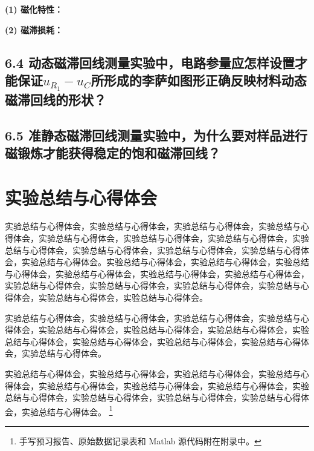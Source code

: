 \documentclass[UTF8]{article}
\theoremstyle{MyLineTheoremStyle} %
\theoremstyle{MyBlockTheoremStyle} %
\theoremstyle{MySubsubsectionStyle} %
\begin{document}
\noindent\textbf{(1) 磁化特性：}



\noindent\textbf{(2) 磁滞损耗：}



\subsection*{6.4 动态磁滞回线测量实验中，电路参量应怎样设置才能保证$u_{R_1}-u_C$所形成的李萨如图形正确反映材料动态磁滞回线的形状？}



\subsection*{6.5 准静态磁滞回线测量实验中，为什么要对样品进行磁锻炼才能获得稳定的饱和磁滞回线？}



\section{实验总结与心得体会}

实验总结与心得体会，实验总结与心得体会，实验总结与心得体会，实验总结与心得体会，实验总结与心得体会，实验总结与心得体会，实验总结与心得体会，实验总结与心得体会，实验总结与心得体会，实验总结与心得体会，实验总结与心得体会，实验总结与心得体会。实验总结与心得体会，实验总结与心得体会，实验总结与心得体会，实验总结与心得体会，实验总结与心得体会，实验总结与心得体会，实验总结与心得体会，实验总结与心得体会，实验总结与心得体会，实验总结与心得体会，实验总结与心得体会，实验总结与心得体会。


实验总结与心得体会，实验总结与心得体会，实验总结与心得体会，实验总结与心得体会，实验总结与心得体会，实验总结与心得体会，实验总结与心得体会，实验总结与心得体会，实验总结与心得体会，实验总结与心得体会，实验总结与心得体会，实验总结与心得体会。


实验总结与心得体会，实验总结与心得体会，实验总结与心得体会，实验总结与心得体会，实验总结与心得体会，实验总结与心得体会，实验总结与心得体会，实验总结与心得体会，实验总结与心得体会，实验总结与心得体会，实验总结与心得体会，实验总结与心得体会。
\footnote{手写预习报告、原始数据记录表和 Matlab 源代码附在附录中。}




\end{document}
